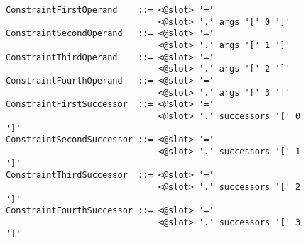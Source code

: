 \begin{figure}[p]
\begin{lstlisting}[language=BNF,basicstyle=\linespread{0.85}\small\ttfamily,
                   firstnumber=41]
ConstraintFirstOperand    ::= <@slot> '='
                              <@slot> '.' args '[' 0 ']'
ConstraintSecondOperand   ::= <@slot> '='
                              <@slot> '.' args '[' 1 ']'
ConstraintThirdOperand    ::= <@slot> '='
                              <@slot> '.' args '[' 2 ']'
ConstraintFourthOperand   ::= <@slot> '='
                              <@slot> '.' args '[' 3 ']'
ConstraintFirstSuccessor  ::= <@slot> '='
                              <@slot> '.' successors '[' 0 ']'
ConstraintSecondSuccessor ::= <@slot> '='
                              <@slot> '.' successors '[' 1 ']'
ConstraintThirdSuccessor  ::= <@slot> '='
                              <@slot> '.' successors '[' 2 ']'
ConstraintFourthSuccessor ::= <@slot> '='
                              <@slot> '.' successors '[' 3 ']'
\end{lstlisting}
\end{figure}

